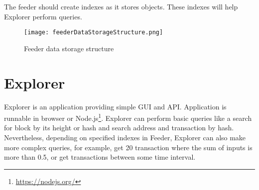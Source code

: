 The feeder should create indexes as it stores objects. These indexes will help Explorer perform queries.


\begin{figure}[h]
    \centering
    \texttt{[image: feederDataStorageStructure.png]}
    \caption{Feeder data storage structure}
    \label{feederDataStorageStructure}
\end{figure}




\section{Explorer}
Explorer is an application providing simple GUI and API. Application is runnable in browser or Node.js\footnote{\url{https://nodejs.org/}}. Explorer can perform basic queries like a search for block by its height or hash and search address and transaction by hash. Nevertheless, depending on specified indexes in Feeder, Explorer can also make more complex queries, for example, get 20 transaction where the sum of inputs is more than 0.5, or get transactions between some time interval.



